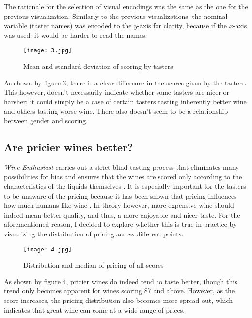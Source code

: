 The rationale for the selection of visual encodings was the same as the one for the previous visualization. Similarly to the previous visualizations, the nominal variable (taster names) was encoded to the $y$-axis for clarity, because if the $x$-axis was used, it would be harder to read the names.

\begin{figure}[h]
  \texttt{[image: 3.jpg]} 
  \caption{Mean and standard deviation of scoring by tasters} %
\end{figure}

As shown by figure 3, there is a clear difference in the scores given by the tasters. This however, doesn't necessarily indicate whether some tasters are nicer or harsher; it could simply be a case of certain tasters tasting inherently better wine and others tasting worse wine. There also doesn't seem to be a relationship between gender and scoring.

\subsection{Are pricier wines better?}
\emph{Wine Enthusiast} carries out a strict blind-tasting process that eliminates many possibilities for bias and ensures that the wines are scored only according to the characteristics of the liquids themselves \cite{WineMag}. It is especially important for the tasters to be unaware of the pricing because it has been shown that pricing influences how much humans like wine \cite{SchmidtSkvortsova2017}. In theory however, more expensive wine should indeed mean better quality, and thus, a more enjoyable and nicer taste. For the aforementioned reason, I decided to explore whether this is true in practice by visualizing the distribution of pricing across different points.


\begin{figure}[h]
  \texttt{[image: 4.jpg]}
  \caption{Distribution and median of pricing of all scores} %
\end{figure}

As shown by figure 4, pricier wines do indeed tend to taste better, though this trend only becomes apparent for wines scoring 87 and above. However, as the score increases, the pricing distribution also becomes more spread out, which indicates that great wine can come at a wide range of prices.

